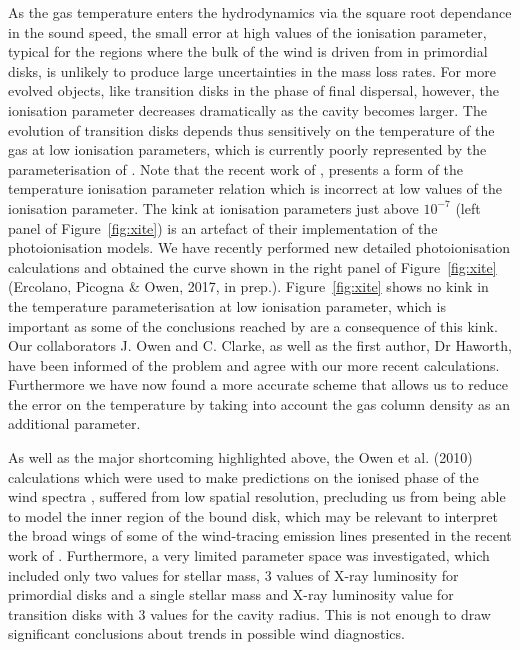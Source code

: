 \documentclass[10pt,fleqn,twoside]{article}
\begin{document}
As the gas temperature enters the hydrodynamics via the square root
dependance in the sound speed, the small error at high values of the
ionisation parameter, typical for the regions where the bulk of the
wind is driven from in primordial disks, is unlikely to produce large
uncertainties in the mass loss rates. For more evolved objects, like
transition disks in the phase of final dispersal, however, the ionisation
parameter decreases dramatically as the cavity becomes larger. The
evolution of transition disks depends thus sensitively on the temperature
of the gas at low ionisation parameters, which is currently poorly
represented by the parameterisation of 
\citet{2008ApJ...688..398E, 2009ApJ...699.1639E}.
Note that the recent work of 
\citet{2016MNRAS.457.1905H},
presents a form of the temperature ionisation parameter relation which is incorrect at
low values of the ionisation parameter. The kink at ionisation
parameters just above $10^{-7}$ (left panel of Figure~\ref{fig:xite}) is an artefact of their implementation
of the photoionisation models. We have recently performed new detailed
photoionisation calculations and obtained the curve shown in the right
panel of Figure~\ref{fig:xite} (Ercolano, Picogna \& Owen, 2017, in prep.).
Figure~\ref{fig:xite} shows no kink in the temperature parameterisation at
low ionisation parameter, which is important as some of the
conclusions reached by
\citet{2016MNRAS.457.1905H} are a consequence of this kink.  Our
collaborators J. Owen and C. Clarke, as well as the first author, Dr Haworth, have been informed of the problem
and agree with our more recent calculations. Furthermore we have now
found a more accurate scheme that allows us to reduce the error on the
temperature by taking into account the gas column density as an additional
parameter. 

As well as the major shortcoming highlighted above, the Owen et
al. (2010) calculations which were used to make predictions on
the ionised phase of the wind spectra 
\citep{2010MNRAS.406.1553E, 2016MNRAS.460.3472E},
suffered from low spatial resolution,
precluding us from being able to model the inner region of the bound disk, which
may be relevant to interpret the broad wings of some of the
wind-tracing emission lines presented in the recent
work of 
\citet{2016ApJ...831..169S}.
Furthermore, a very limited
parameter space was investigated, which included only two values for
stellar mass, 3 values of X-ray luminosity for primordial disks and a
single stellar mass and X-ray luminosity value for transition disks
with 3 values for the cavity radius. This is not enough to draw 
significant conclusions about trends in possible wind diagnostics. 
\end{document}
